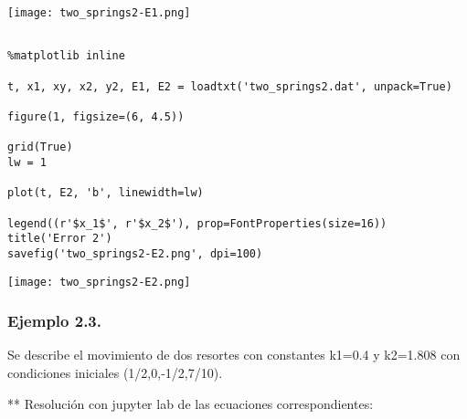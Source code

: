 \documentclass{article} %
\begin{document}
\begin{center}
 	\texttt{[image: two\_springs2-E1.png]}
 \end{center}




\begin{verbatim} 

%matplotlib inline

t, x1, xy, x2, y2, E1, E2 = loadtxt('two_springs2.dat', unpack=True)

figure(1, figsize=(6, 4.5))

grid(True)
lw = 1

plot(t, E2, 'b', linewidth=lw)

legend((r'$x_1$', r'$x_2$'), prop=FontProperties(size=16))
title('Error 2')
savefig('two_springs2-E2.png', dpi=100)

\end{verbatim}



\begin{center}
 	\texttt{[image: two\_springs2-E2.png]}
 \end{center}




\subsubsection{Ejemplo 2.3.}
Se describe el movimiento de dos resortes con constantes k1=0.4 y k2=1.808 con condiciones iniciales (1/2,0,-1/2,7/10).

\vspace{0.5 cm}

** Resolución con jupyter lab de las ecuaciones correspondientes:
\end{document}
